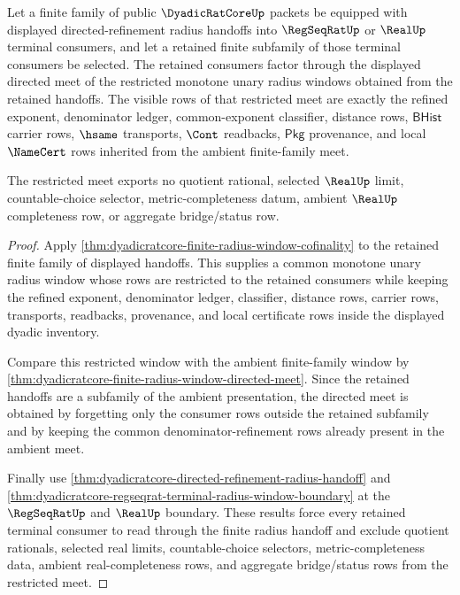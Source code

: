 \begin{theorem}
\label{thm:dyadicratcore-finite-radius-window-filtered-meet}
Let a finite family of public $\DyadicRatCoreUp$ packets be equipped with
displayed directed-refinement radius handoffs into $\RegSeqRatUp$ or $\RealUp$
terminal consumers, and let a retained finite subfamily of those terminal
consumers be selected. The retained consumers factor through the displayed
directed meet of the restricted monotone unary radius windows obtained from
the retained handoffs. The visible rows of that restricted meet are exactly the
refined exponent, denominator ledger, common-exponent classifier, distance
rows, $\mathsf{BHist}$ carrier rows, $\hsame$ transports, $\Cont$ readbacks,
$\mathsf{Pkg}$ provenance, and local $\NameCert$ rows inherited from the
ambient finite-family meet.

The restricted meet exports no quotient rational, selected $\RealUp$ limit,
countable-choice selector, metric-completeness datum, ambient $\RealUp$
completeness row, or aggregate bridge/status row.
\end{theorem}
\begin{proof}
Apply \autoref{thm:dyadicratcore-finite-radius-window-cofinality} to the
retained finite family of displayed handoffs. This supplies a common monotone
unary radius window whose rows are restricted to the retained consumers while
keeping the refined exponent, denominator ledger, classifier, distance rows,
carrier rows, transports, readbacks, provenance, and local certificate rows
inside the displayed dyadic inventory.

Compare this restricted window with the ambient finite-family window by
\autoref{thm:dyadicratcore-finite-radius-window-directed-meet}. Since the
retained handoffs are a subfamily of the ambient presentation, the directed
meet is obtained by forgetting only the consumer rows outside the retained
subfamily and by keeping the common denominator-refinement rows already present
in the ambient meet.

Finally use
\autoref{thm:dyadicratcore-directed-refinement-radius-handoff} and
\autoref{thm:dyadicratcore-regseqrat-terminal-radius-window-boundary} at the
$\RegSeqRatUp$ and $\RealUp$ boundary. These results force every retained
terminal consumer to read through the finite radius handoff and exclude
quotient rationals, selected real limits, countable-choice selectors,
metric-completeness data, ambient real-completeness rows, and aggregate
bridge/status rows from the restricted meet.
\end{proof}

